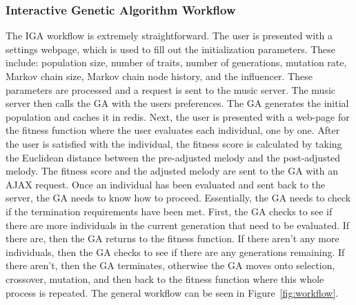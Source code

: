 \documentclass[12pt]{article} %
\begin{document}
\subsubsection{Interactive Genetic Algorithm Workflow}
The IGA workflow is extremely straightforward. The user is presented with a settings webpage, which is used to fill out the initialization parameters. These include: population size, number of traits, number of generations, mutation rate, Markov chain size, Markov chain node history, and the influencer. These parameters are processed and a request is sent to the music server. The music server then calls the GA with the users preferences. The GA generates the initial population and caches it in redis. Next, the user is presented with a web-page for the fitness function where the user evaluates each individual, one by one. After the user is satisfied with the individual, the fitness score is calculated by taking the Euclidean distance between the pre-adjusted melody and the post-adjusted melody. The fitness score and the adjusted melody are sent to the GA with an AJAX request. Once an individual has been evaluated and sent back to the server, the GA needs to know how to proceed. Essentially, the GA needs to check if the termination requirements have been met. First, the GA checks to see if there are more individuals in the current generation that need to be evaluated. If there are, then the GA returns to the fitness function. If there aren't any more individuals, then the GA checks to see if there are any generations remaining. If there aren't, then the GA terminates, otherwise the GA moves onto selection, crossover, mutation, and then back to the fitness function where this whole process is repeated. The general workflow can be seen in Figure~\ref{fig:workflow}.
\end{document}
